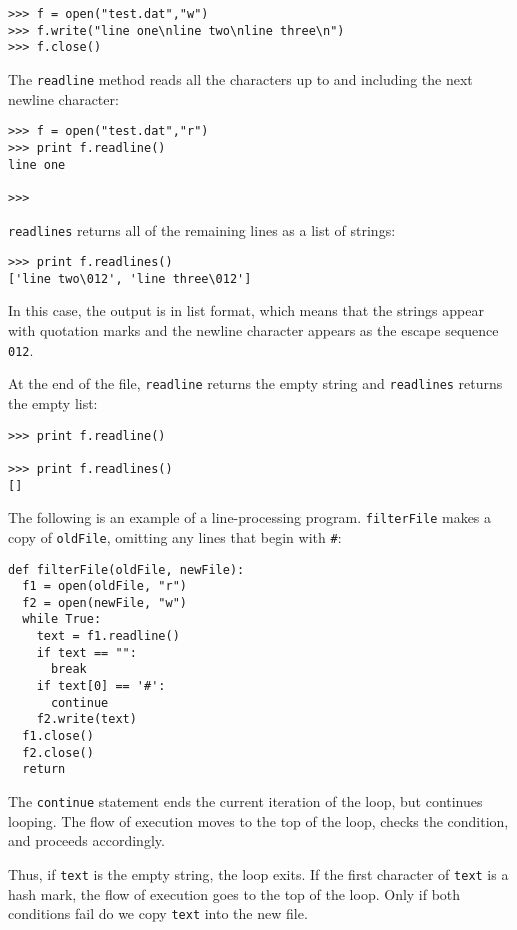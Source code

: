 \beforeverb
\begin{verbatim}
>>> f = open("test.dat","w")
>>> f.write("line one\nline two\nline three\n")
>>> f.close()
\end{verbatim}
\afterverb
%
The {\tt readline} method reads all the characters
up to and including the next newline character:

\beforeverb
\begin{verbatim}
>>> f = open("test.dat","r")
>>> print f.readline()
line one

>>>
\end{verbatim}
\afterverb
%
{\tt readlines} returns all of the remaining
lines as a list of strings:

\beforeverb
\begin{verbatim}
>>> print f.readlines()
['line two\012', 'line three\012']
\end{verbatim}
\afterverb
%
In this case, the output is in list format, which means that the
strings appear with quotation marks and the newline character
appears as the escape sequence {\tt \\012}.

At the end of the file, {\tt readline} returns the empty string
and {\tt readlines} returns the empty list:

\beforeverb
\begin{verbatim}
>>> print f.readline()

>>> print f.readlines()
[]
\end{verbatim}
\afterverb
%
The following is an example of a line-processing program.
{\tt filterFile} makes a copy of {\tt oldFile}, omitting
any lines that begin with {\tt \#}:

\beforeverb
\begin{verbatim}
def filterFile(oldFile, newFile):
  f1 = open(oldFile, "r")
  f2 = open(newFile, "w")
  while True:
    text = f1.readline()
    if text == "":
      break
    if text[0] == '#':
      continue
    f2.write(text)
  f1.close()
  f2.close()
  return
\end{verbatim}
\afterverb
%
The {\tt continue} statement ends the current iteration of the
loop, but continues looping.  The flow of
execution moves to the top of the loop, checks the condition,
and proceeds accordingly.


Thus, if {\tt text} is the empty string, the loop exits.  If
the first character of {\tt text} is a hash mark, the flow
of execution goes to
the top of the loop.  Only if both conditions fail do we copy
{\tt text} into the new file.


